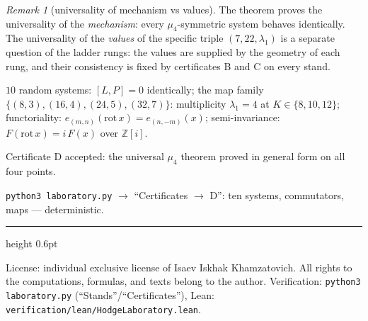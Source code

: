 \documentclass[11pt,a4paper]{article}
\theoremstyle{plain}
\theoremstyle{definition}
\theoremstyle{remark}
\newtheorem{remark}[theorem]{Remark}
\newcommand{\ZZ}{\mathbb{Z}}
\begin{document}
\begin{remark}[universality of mechanism vs values]
The theorem proves the universality of the \emph{mechanism}: every
$\mu_4$-symmetric system behaves identically. The universality of
the \emph{values} of the specific triple $(7,22,\lambda_1)$ is a
separate question of the ladder rungs: the values are supplied by
the geometry of each rung, and their consistency is fixed by
certificates B and C on every stand.
\end{remark}

\begin{databox}[checks]
$10$ random systems: $[L,P]=0$ identically; the map family
$\{(8,3),(16,4),(24,5),(32,7)\}$: multiplicity $\lambda_1=4$ at
$K\in\{8,10,12\}$; functoriality:
$e_{(m,n)}(\mathrm{rot}\,x)=e_{(n,-m)}(x)$; semi-invariance:
$F(\mathrm{rot}\,x)=i\,F(x)$ over $\ZZ[i]$.
\end{databox}

\begin{statusbox}[summary]
Certificate D accepted: the universal $\mu_4$ theorem proved in
general form on all four points.
\end{statusbox}

\begin{verifybox}[reproduction]
\texttt{python3 laboratory.py} $\to$ ``Certificates $\to$ D'': ten
systems, commutators, maps --- deterministic.
\end{verifybox}

\vfill
{\color{linkblue}\hrule height 0.6pt}
\vspace{0.5em}
{\small\color{gray}
License: individual exclusive license of Isaev Iskhak Khamzatovich.
All rights to the computations, formulas, and texts belong to the author.
Verification: \texttt{python3 laboratory.py} (``Stands''/``Certificates''),
Lean: \texttt{verification/lean/HodgeLaboratory.lean}.
}
\end{document}
